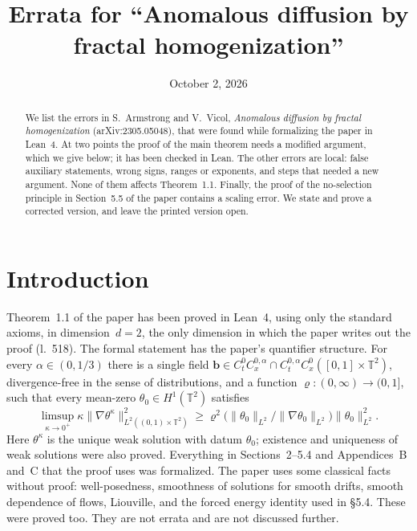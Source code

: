 \documentclass[11pt]{amsart}
\title[Errata for ``Anomalous diffusion by fractal homogenization'']{Errata for ``Anomalous diffusion by fractal homogenization''}
\date{October 2, 2026}
\makeatletter
\newcommand{\TT}{\mathbb{T}}
\newcommand{\Ln}[1]{l.~#1}
\newcommand{\nf}[2]{\nicefrac{#1}{#2}}
\providecommand{\nicefrac}[2]{#1/#2}
\renewcommand\paragraph{\@startsection{paragraph}{4}{\z@}{.5\linespacing\@plus.2\linespacing}{-.5em}{\normalfont\bfseries}}
\theoremstyle{remark}
\makeatother
\begin{document}
\begin{abstract}
We list the errors in S.~Armstrong and V.~Vicol, \emph{Anomalous diffusion by fractal homogenization} (arXiv:2305.05048), that were found while formalizing the paper in Lean~4. At two points the proof of the main theorem needs a modified argument, which we give below; it has been checked in Lean. The other errors are local: false auxiliary statements, wrong signs, ranges or exponents, and steps that needed a new argument. None of them affects Theorem~1.1. Finally, the proof of the no-selection principle in Section~5.5 of the paper contains a scaling error. We state and prove a corrected version, and leave the printed version open.
\end{abstract}

\maketitle

\section{Introduction}

\paragraph{What was formalized.}
Theorem~1.1 of the paper has been proved in Lean~4, using only the standard axioms, in dimension~$d=2$, the only dimension in which the paper writes out the proof (\Ln{518}). The formal statement has the paper's quantifier structure. For every $\alpha\in(0,\nf13)$ there is a single field $\mathbf b\in C^0_tC^{0,\alpha}_x\cap C^{0,\alpha}_tC^0_x([0,1]\times\TT^2)$, divergence-free in the sense of distributions, and a function $\varrho:(0,\infty)\to(0,1]$, such that every mean-zero $\theta_0\in H^1(\TT^2)$ satisfies
\begin{equation}
\label{t.main}
\limsup_{\kappa\to0^+}\kappa\|\nabla\theta^\kappa\|_{L^2((0,1)\times\TT^2)}^2\geq\varrho^2\bigl(\|\theta_0\|_{L^2}/\|\nabla\theta_0\|_{L^2}\bigr)\|\theta_0\|_{L^2}^2 .
\end{equation}
Here $\theta^\kappa$ is the unique weak solution with datum $\theta_0$; existence and uniqueness of weak solutions were also proved. Everything in Sections~2--5.4 and Appendices~B and~C that the proof uses was formalized. The paper uses some classical facts without proof: well-posedness, smoothness of solutions for smooth drifts, smooth dependence of flows, Liouville, and the forced energy identity used in \S5.4. These were proved too. They are not errata and are not discussed further.
\end{document}
